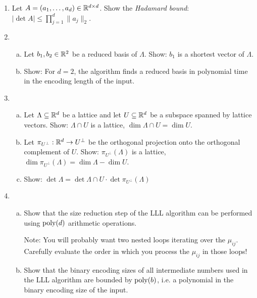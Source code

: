 \begin{enumerate}
  \item Let $A = (a_1, \ldots, a_d) \in \mathbb{R}^{d \times d}$.
    Show the \emph{Hadamard bound}: $|\det A| \leq \prod_{j=1}^d \| a_j \|_2$.

  \item
  \begin{enumerate}[(a)]
    \item Let $b_1,b_2 \in \mathbb{R}^2$ be a reduced basis of $\Lambda$.
      Show: $b_1$ is a shortest vector of $\Lambda$.

    \item Show: For $d=2$,
      the algorithm  finds a reduced basis in polynomial time
      in the encoding length of the input.
  \end{enumerate}

  \item
  \begin{enumerate}[(a)]
    \item Let $\Lambda \subseteq \mathbb{R}^d$ be a lattice and
    let $U \subseteq \mathbb{R}^d$ be a subspace spanned by lattice vectors.
    Show: $\Lambda \cap U$ is a lattice, $\dim \Lambda \cap U = \dim U$.

    \item Let $\pi_{U^\bot} : \mathbb{R}^d \to U^\bot$ be the orthogonal projection onto the orthogonal
    complement of $U$.
    Show: $\pi_{U^\bot} (\Lambda)$ is a lattice, $\dim \pi_{U^\bot} (\Lambda) = \dim \Lambda - \dim U$.

    \item Show: $\det \Lambda = \det \Lambda \cap U \cdot \det \pi_{U^\bot} (\Lambda)$
  \end{enumerate}

  \item
    \begin{enumerate}[(a)]
      \item Show that the size reduction step of the LLL algorithm can be performed using $\operatorname{poly}(d)$ arithmetic operations.

        Note: You will probably want two nested loops iterating over the $\mu_{ij}$.
        Carefully evaluate the order in which you process the $\mu_{ij}$ in those loops!

      \item Show that the binary encoding sizes of all intermediate numbers used in the LLL algorithm
        are bounded by $\operatorname{poly}(b)$, i.e. a polynomial in the binary encoding size of the input.
    \end{enumerate}


\end{enumerate}
